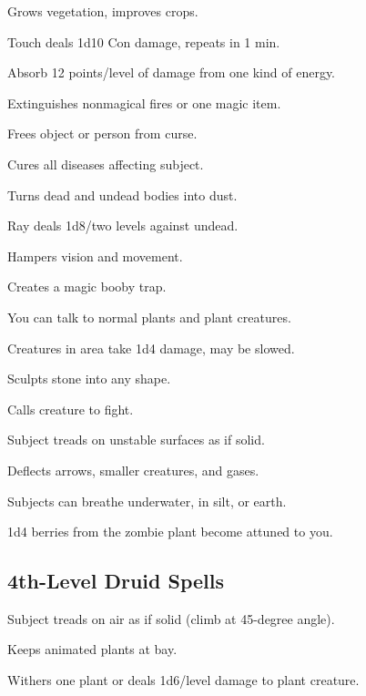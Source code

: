  Grows vegetation, improves crops.

 Touch deals 1d10 Con damage, repeats in 1 min.

 Absorb 12 points/level of damage from one kind of energy.

 Extinguishes nonmagical fires or one magic item.

 Frees object or person from curse.

 Cures all diseases affecting subject.

 Turns dead and undead bodies into dust.

 Ray deals 1d8/two levels against undead.

 Hampers vision and movement.

 Creates a magic booby trap.

 You can talk to normal plants and plant creatures.

 Creatures in area take 1d4 damage, may be slowed.

 Sculpts stone into any shape.

 Calls creature to fight.

 Subject treads on unstable surfaces as if solid.


 Deflects arrows, smaller creatures, and gases.

 Subjects can breathe underwater, in silt, or earth.

 1d4 berries from the zombie plant become attuned to you.



\subsection{4th-Level Druid Spells}

 Subject treads on air as if solid (climb at 45-degree angle).

 Keeps animated plants at bay.

 Withers one plant or deals 1d6/level damage to plant creature.


